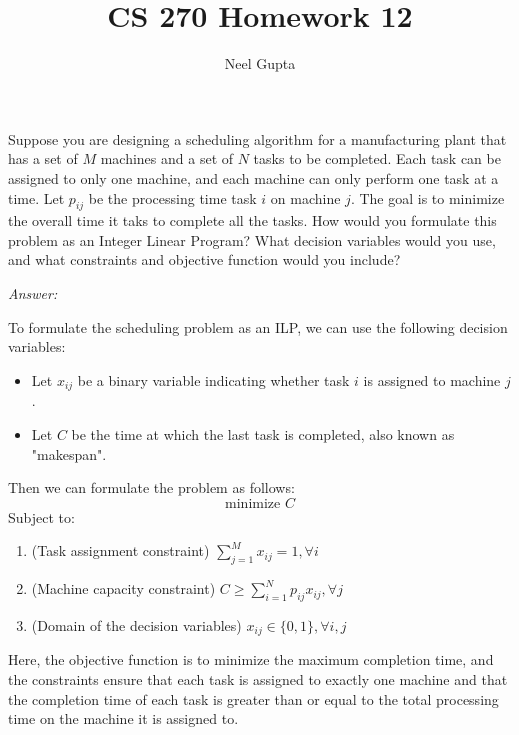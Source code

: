 \documentclass[12pt]{article}
\newenvironment{problem}[2][Problem]{\begin{trivlist}
\item[\hskip \labelsep {\bfseries #1}\hskip \labelsep {\bfseries #2.}]}{\end{trivlist}}
\begin{document}

\title{\vspace{-4cm}CS 270 Homework 12}
\author{Neel Gupta} 
\maketitle

\begin{problem}{1}
    Suppose you are designing a scheduling algorithm for a manufacturing plant that has a set of $M$ machines and a set of $N$ tasks to be completed. Each task can be assigned to only one machine, and each machine can only perform one task at a time. Let $p_{ij}$ be the processing time task $i$ on machine $j$. The goal is to minimize the overall time it taks to complete all the tasks. How would you formulate this problem as an Integer Linear Program? What decision variables would you use, and what constraints and objective function would you include?
\end{problem}

\textit{Answer:}

To formulate the scheduling problem as an ILP, we can use the following decision variables:
\begin{itemize}
    \item Let $x_{ij}$ be a binary variable indicating whether task $i$ is assigned to machine $j$.
    \item Let $C$ be the time at which the last task is completed, also known as "makespan".
\end{itemize}

Then we can formulate the problem as follows:
$$
\text{minimize } C
$$
Subject to:
\begin{enumerate}[1.]
    \item (Task assignment constraint) $\sum_{j=1}^{M} x_{ij} = 1, \forall i$
    \item (Machine capacity constraint) $C \ge \sum_{i=1}^{N} p_{ij} x_{ij}, \forall j$
    \item (Domain of the decision variables) $x_{ij} \in \{0, 1\}, \forall i, j$
\end{enumerate}

Here, the objective function is to minimize the maximum completion time, and the constraints ensure that each task is assigned to exactly one machine and that the completion time of each task is greater than or equal to the total processing time on the machine it is assigned to.
\end{document}
